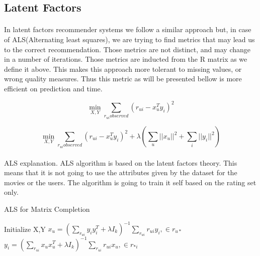 \subsection{Latent Factors}
\paragraph{} In latent factors recommender systems we follow a similar approach but, in case of ALS(Alternating least squares), we are trying to find metrics that may lead us to the correct recommendation. Those metrics are not distinct, and may change in a number of iterations. Those metrics are inducted from the R matrix as we define it above. This makes this approach more tolerant to missing values, or wrong quality measures. Thus this metric as will be presented bellow is more efficient on prediction and time.
\cite{DistributedAlgorithmsAndOptimization:4}

\begin{equation}
	\min_{X,Y} \sum_{r_{ui}observed}(r_{ui}-x_{u}^{T}y_{i})^{2}
\end{equation}

\begin{equation}
	\min_{X,Y} \sum_{r_{ui}observed}(r_{ui}-x_{u}^{T}y_{i})^{2} + \lambda(\sum_{u}||x_{u}||^2 + \sum_{i}||y_{i}||^2)
\end{equation}



\paragraph{} ALS explanation.
ALS algorithm is based on the latent factors theory. This means that it is not going to use the attributes given by the dataset for the movies or the users. The algorithm is going to train it self based on the rating set only.


\begin{algorithm}
	\caption{ALS for Matrix Completion}\label{ALS}
	\begin{algorithmic}[1]
		\State Initialize X,Y
		\Repeat
		\State $x_{u} = (\sum_{r_{ui}}y_{i}y_{i}^{T} + \lambda I_k)^{-1} \sum_{r_{ui}}r_{ui}y_{i} ,\in r_{u*}$
		\EndFor
		\State $y_{i} = (\sum_{r_{ui}}x_{u}x_{u}^{T} + \lambda I_k)^{-1} \sum_{r_{ui}}r_{ui}x_{u} ,\in r_{*i}$
		\EndFor
	\end{algorithmic}
\end{algorithm}